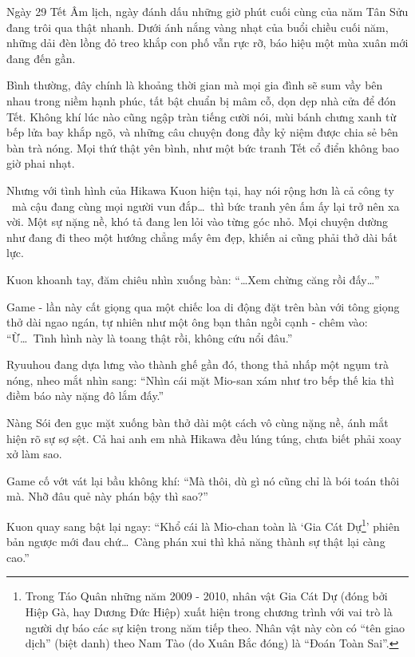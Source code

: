 \documentclass[../main.tex]{subfiles}
\begin{document}

Ngày 29 Tết Âm lịch, ngày đánh dấu những giờ phút cuối cùng của năm Tân Sửu đang trôi qua thật nhanh. Dưới ánh nắng vàng nhạt của buổi chiều cuối năm, những dải đèn lồng đỏ treo khắp con phố vẫn rực rỡ, báo hiệu một mùa xuân mới đang đến gần.

Bình thường, đây chính là khoảng thời gian mà mọi gia đình sẽ sum vầy bên nhau trong niềm hạnh phúc, tất bật chuẩn bị mâm cỗ, dọn dẹp nhà cửa để đón Tết. Không khí lúc nào cũng ngập tràn tiếng cười nói, mùi bánh chưng xanh từ bếp lửa bay khắp ngõ, và những câu chuyện đong đầy kỷ niệm được chia sẻ bên bàn trà nóng. Mọi thứ thật yên bình, như một bức tranh Tết cổ điển không bao giờ phai nhạt.

Nhưng với tình hình của Hikawa Kuon hiện tại, hay nói rộng hơn là cả công ty \hll\ mà cậu đang cùng mọi người vun đắp\dots\ thì bức tranh yên ấm ấy lại trở nên xa vời. Một sự nặng nề, khó tả đang len lỏi vào từng góc nhỏ. Mọi chuyện dường như đang đi theo một hướng chẳng mấy êm đẹp, khiến ai cũng phải thở dài bất lực.

Kuon khoanh tay, đăm chiêu nhìn xuống bàn: ``\dots Xem chừng căng rồi đấy\dots''

Game - lần này cất giọng qua một chiếc loa di động đặt trên bàn với tông giọng thở dài ngao ngán, tự nhiên như một ông bạn thân ngồi cạnh - chêm vào: ``Ừ\dots\ Tình hình này là toang thật rồi, không cứu nổi đâu.''

Ryuuhou đang dựa lưng vào thành ghế gần đó, thong thả nhấp một ngụm trà nóng, nheo mắt nhìn sang: ``Nhìn cái mặt Mio-san xám như tro bếp thế kia thì điềm báo này nặng đô lắm đấy.''

Nàng Sói đen gục mặt xuống bàn thở dài một cách vô cùng nặng nề, ánh mắt hiện rõ sự sợ sệt. Cả hai anh em nhà Hikawa đều lúng túng, chưa biết phải xoay xở làm sao.


Game cố vớt vát lại bầu không khí: ``Mà thôi, dù gì nó cũng chỉ là bói toán thôi mà. Nhỡ đâu quẻ này phán bậy thì sao?''

Kuon quay sang bật lại ngay: ``Khổ cái là Mio-chan toàn là `Gia Cát Dự\footnote{Trong Táo Quân những năm 2009 - 2010, nhân vật Gia Cát Dự (đóng bởi Hiệp Gà, hay Dương Đức Hiệp) xuất hiện trong chương trình với vai trò là người dự báo các sự kiện trong năm tiếp theo. Nhân vật này còn có ``tên giao dịch'' (biệt danh) theo Nam Tào (do Xuân Bắc đóng) là ``Đoán Toàn Sai''.}' phiên bản ngược mới đau chứ\dots\ Càng phán xui thì khả năng thành sự thật lại càng cao.''
\end{document}
